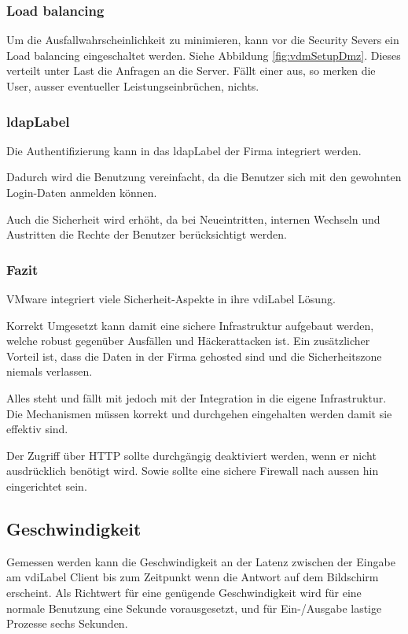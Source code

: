 \subsubsection{Load balancing}
Um die Ausfallwahrscheinlichkeit zu minimieren, kann vor die Security Severs ein Load balancing eingeschaltet werden. Siehe Abbildung \ref{fig:vdmSetupDmz}. Dieses verteilt unter Last die Anfragen an die Server. Fällt einer aus, so merken die User, ausser eventueller Leistungseinbrüchen, nichts. 

\subsubsection{\Gls{ldapLabel}}
Die Authentifizierung kann in das \Gls{ldapLabel} der Firma integriert werden.

Dadurch wird die Benutzung vereinfacht, da die Benutzer sich mit den gewohnten Login-Daten anmelden können.

Auch die Sicherheit wird erhöht, da bei Neueintritten, internen Wechseln und Austritten die Rechte der Benutzer berücksichtigt werden.

\subsubsection{Fazit}
VMware integriert viele Sicherheit-Aspekte in ihre \Gls{vdiLabel} Lösung.

Korrekt Umgesetzt kann damit eine sichere Infrastruktur aufgebaut werden, welche robust gegenüber Ausfällen und Häckerattacken ist. Ein zusätzlicher Vorteil ist, dass die Daten in der Firma gehosted sind und die Sicherheitszone niemals verlassen.

Alles steht und fällt mit jedoch mit der Integration in die eigene Infrastruktur. Die Mechanismen müssen korrekt und durchgehen eingehalten werden damit sie effektiv sind. 

Der Zugriff über HTTP sollte durchgängig deaktiviert werden, wenn er nicht ausdrücklich benötigt wird. Sowie sollte eine sichere Firewall nach aussen hin eingerichtet sein.

\subsection{Geschwindigkeit}
Gemessen werden kann die Geschwindigkeit an der Latenz zwischen der Eingabe am \Gls{vdiLabel} Client bis zum Zeitpunkt wenn die Antwort auf dem Bildschirm erscheint. Als Richtwert für eine genügende Geschwindigkeit wird für eine normale Benutzung eine Sekunde vorausgesetzt, und für Ein-/Ausgabe lastige Prozesse sechs Sekunden.

